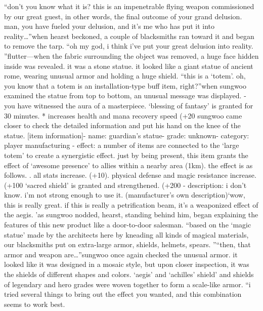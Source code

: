 “don’t you know what it is? this is an impenetrable flying weapon commissioned by our great guest, in other words, the final outcome of your grand delusion.
 man, you have fueled your delusion, and it’s me who has put it into reality…”when hearst beckoned, a couple of blacksmiths ran toward it and began to remove the tarp.
“oh my god, i think i’ve put your great delusion into reality.
”flutter—when the fabric surrounding the object was removed, a huge face hidden inside was revealed.
it was a stone statue.
 it looked like a giant statue of ancient rome, wearing unusual armor and holding a huge shield.
“this is a ‘totem’.
 oh, you know that a totem is an installation-type buff item, right?”when sungwoo examined the statue from top to bottom, an unusual message was displayed.
- you have witnessed the aura of a masterpiece.
 ‘blessing of fantasy’ is granted for 30 minutes.
* increases health and mana recovery speed (+20%
sungwoo came closer to check the detailed information and put his hand on the knee of the statue.
[item information]- name: guardian’s statue- grade: unknown- category: player manufacturing
- effect: a number of items are connected to the ‘large totem’ to create a synergistic effect.
 just by being present, this item grants the effect of ‘awesome presence’ to allies within a nearby area (1km).
 the effect is as follows.
.
 all stats increase.
 (+10).
 physical defense and magic resistance increase.
 (+100%
 ‘sacred shield’ is granted and strengthened.
 (+200%
- description: i don’t know.
 i’m not strong enough to use it.
 (manufacturer’s own description)‘wow, this is really great.
 if this is really a petrification beam, it’s a weaponized effect of the aegis.
’as sungwoo nodded, hearst, standing behind him, began explaining the features of this new product like a door-to-door salesman.
“based on the ‘magic statue’ made by the architects here by kneading all kinds of magical materials, our blacksmiths put on extra-large armor, shields, helmets, spears.
”“then, that armor and weapon are…”sungwoo once again checked the unusual armor.
 it looked like it was designed in a mosaic style, but upon closer inspection, it was the shields of different shapes and colors.
‘aegis’ and ‘achilles’ shield’ and shields of legendary and hero grades were woven together to form a scale-like armor.
“i tried several things to bring out the effect you wanted, and this combination seems to work best.
